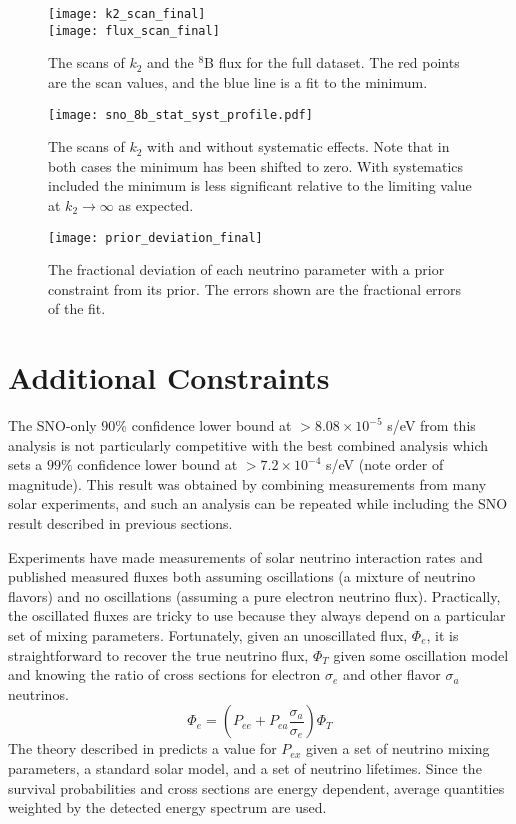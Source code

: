 \begin{figure}
\centering
\texttt{[image: k2\_scan\_final]} \\
\vspace{12pt}
\texttt{[image: flux\_scan\_final]}
\caption{The scans of $k_2$ and the $^8$B flux for the full dataset. The red points are the scan values, and the blue line is a fit to the minimum.}
\label{fig:final_scans}
\end{figure}

\begin{figure}
\centering
\texttt{[image: sno\_8b\_stat\_syst\_profile.pdf]}
\caption{The scans of $k_2$ with and without systematic effects. Note that in both cases the minimum has been shifted to zero. With systematics included the minimum is less significant relative to the limiting value at $k_2 \rightarrow \infty$ as expected.}
\label{fig:systematic_scans}
\end{figure}

\begin{figure}
\centering
\texttt{[image: prior\_deviation\_final]}
\caption{The fractional deviation of each neutrino parameter with a prior constraint from its prior. The errors shown are the fractional errors of the fit.}
\label{fig:priors_final}
\end{figure}


\section{Additional Constraints}

The SNO-only $90\%$ confidence lower bound at $>8.08\times10^{-5}$ s/eV from this analysis is not particularly competitive with the best combined analysis \cite{picoreti} which sets a $99\%$ confidence lower bound at $>7.2\times10^{-4}$ s/eV (note order of magnitude).
This result was obtained by combining measurements from many solar experiments, and such an analysis can be repeated while including the SNO result described in previous sections.

Experiments have made measurements of solar neutrino interaction rates and published measured fluxes both assuming oscillations (a mixture of neutrino flavors) and no oscillations (assuming a pure electron neutrino flux). 
Practically, the oscillated fluxes are tricky to use because they always depend on a particular set of mixing parameters.
Fortunately, given an unoscillated flux, $\Phi_e$, it is straightforward to recover the true neutrino flux, $\Phi_T$ given some oscillation model and knowing the ratio of cross sections for electron $\sigma_e$ and other flavor $\sigma_a$ neutrinos.
\begin{equation}
\Phi_e = (P_{ee} + P_{ea} \frac{\sigma_a}{\sigma_e})\Phi_T
\label{flux_conv}
\end{equation}
The theory described in  predicts a value for $P_{ex}$ given a set of neutrino mixing parameters, a standard solar model, and a set of neutrino lifetimes.
Since the survival probabilities and cross sections are energy dependent, average quantities weighted by the detected energy spectrum are used.

